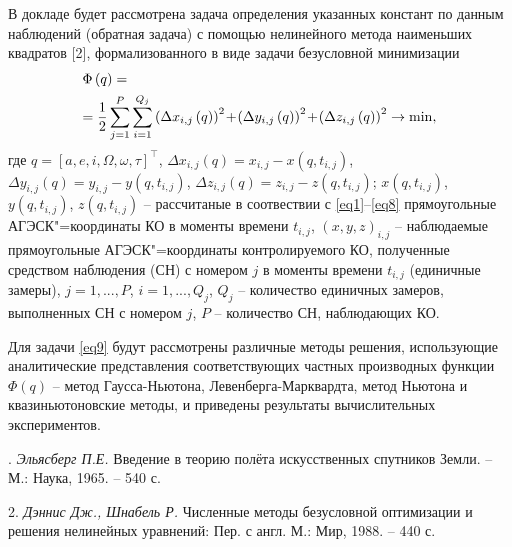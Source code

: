 В докладе будет рассмотрена задача определения указанных констант по данным наблюдений (обратная задача) с помощью нелинейного метода наименьших квадратов [2], формализованного в виде задачи безусловной минимизации
\vskip-7mm
\begin{equation}
\label{eq9}
\begin{gathered}
  \Phi \left( q \right) =  \hfill \\
   = \frac{1}{2}\sum\limits_{j = 1}^P {\sum\limits_{i = 1}^{{Q_j}} {{{\left( {\Delta {x_{i,j}}\left( q \right)} \right)}^2}
\!+\!
{{\left( {\Delta {y_{i,j}}\left( q \right)} \right)}^2}
\!+\!
{{\left( {\Delta {z_{i,j}}\left( q \right)} \right)}^2} \to \min } ,}  \hfill \\
\end{gathered}
\end{equation}
\vskip-5mm
\noindent
где
$q = {\left[ {a,e,i,\Omega ,\omega ,\tau } \right]^{\top}}$,
$\Delta {x_{i,j}}\left( q \right) = {x_{i,j}} \!-\! x\left( {q,{t_{i,j}}} \right)$,
$\Delta {y_{i,j}}\left( q \right) = {y_{i,j}} \!-\! y\left( {q,{t_{i,j}}} \right)$,
$\Delta {z_{i,j}}\left( q \right) = {z_{i,j}} \!-\! z\left( {q,{t_{i,j}}} \right)$;
$x\left( {q,{t_{i,j}}} \right)$,
$y\left( {q,{t_{i,j}}} \right)$,
$z\left( {q,{t_{i,j}}} \right)$ --
рассчитаные в соотвествии с \eqref{eq1}--\eqref{eq8} прямоугольные АГЭСК"=координаты КО в моменты времени
${t_{i,j}}$,
${\left( {x,y,z} \right)_{i,j}}$ --
наблюдаемые прямоугольные АГЭСК"=координаты контролируемого КО,
полученные средством наблюдения (СН) с номером $j$ в моменты времени
${t_{i,j}}$ (единичные замеры),
$j=1,...,P$,
$i=1,...,Q_j$,
$Q_j$ -- количество единичных замеров, выполненных СН с номером $j$,
$P$ -- количество СН, наблюдающих КО.

Для задачи \eqref{eq9} будут рассмотрены различные методы решения, использующие аналитические представления соответствующих частных производных функции
$\Phi \left( q \right)$
 -- метод Гаусса-Ньютона, Левенберга-Марквардта, метод Ньютона и квазиньютоновские методы, и приведены результаты вычислительных экспериментов.

. {\it Эльясберг П.Е.}
 Введение в теорию полёта искусственных спутников Земли. – М.: Наука, 1965. – 540 с.

2. {\it Дэннис Дж., Шнабель Р.} Численные методы безусловной оптимизации и решения нелинейных уравнений: Пер. с англ. М.: Мир, 1988. – 440 с.
